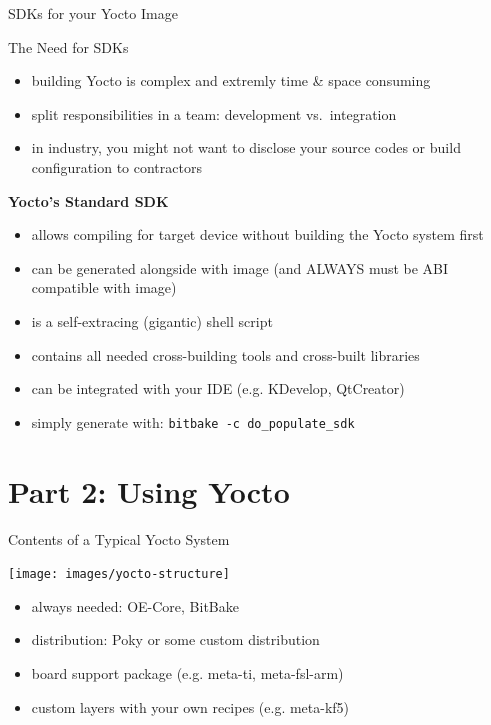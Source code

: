 \documentclass[ucs,9pt]{beamer}
\begin{document}
\begin{frame}
    {SDKs for your Yocto Image}

    \begin{block}{The Need for SDKs}
    \begin{itemize}
        \item building Yocto is complex and extremly time \& space consuming
        \item split responsibilities in a team: development vs.\ integration
        \item in industry, you might not want to disclose your source codes or build configuration to contractors
    \end{itemize}
    \end{block}
    \smallskip
    \par
    \textbf{Yocto's Standard SDK}
    \begin{itemize}
        \item allows compiling for target device without building the Yocto system first
        \item can be generated alongside with image (and ALWAYS must be ABI compatible with image)
        \item is a self-extracing (gigantic) shell script
        \item contains all needed cross-building tools and cross-built libraries
        \item can be integrated with your IDE (e.g. KDevelop, QtCreator)
        \item simply generate with: \texttt{bitbake -c do\_populate\_sdk}
    \end{itemize}
\end{frame}

\section{Part 2: Using Yocto}

\begin{frame}
    {Contents of a Typical Yocto System}

    \vspace{-1em}
    \begin{center}
    \texttt{[image: images/yocto-structure]}
    \end{center}
    \begin{itemize}
        \item always needed: OE-Core, BitBake
        \item distribution: Poky or some custom distribution
        \item board support package (e.g. meta-ti, meta-fsl-arm)
        \item custom layers with your own recipes (e.g. meta-kf5)
    \end{itemize}
\end{frame}
\end{document}
